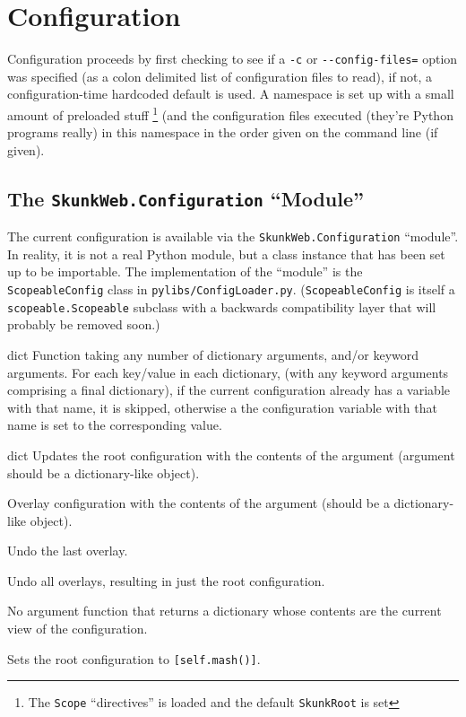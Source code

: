 \documentclass{manual}
\begin{document}
\section{Configuration}
Configuration proceeds by first checking to see if a \verb!-c! or
\verb!--config-files=! option was specified (as a colon delimited list
of configuration files to read), if not, a configuration-time
hardcoded default is used.  A namespace is set up with a small amount
of preloaded stuff \footnote{The \texttt{Scope} ``directives'' is loaded and the default \texttt{SkunkRoot} is set}
(and the configuration files executed (they're
Python programs really) in this namespace in the order given on the
command line (if given).

\subsection{The \texttt{SkunkWeb.Configuration} ``Module''}

The current configuration is available via the
\texttt{SkunkWeb.Configuration} ``module''.  In reality, it is not a
real Python module, but a class instance that has been set up to be
importable.  The implementation of the ``module'' is the
\texttt{ScopeableConfig} class in  \verb!pylibs/ConfigLoader.py!.
(\texttt{ScopeableConfig} is itself a \texttt{scopeable.Scopeable} subclass
with a backwards compatibility layer that will probably be removed soon.)

\begin{methoddesc}{\mergeDefaults}{dict} Function taking any number of dictionary
arguments, and/or keyword arguments. For each key/value in each dictionary, (with 
any keyword arguments comprising a final dictionary), if the current
configuration already has a variable with that name, it is skipped,
otherwise a the configuration variable with that name is set to the
corresponding value. 
\end{methoddesc}

\begin{methoddesc}{\update}{dict} Updates the root configuration with the
contents of the argument (argument should be a dictionary-like
object). 
\end{methoddesc}
\begin{methoddesc}{\push}{} Overlay configuration with the contents
of the argument (should be a dictionary-like object). 
\end{methoddesc}
\begin{methoddesc}{\pop}{} Undo the last overlay.
\end{methoddesc}
\begin{methoddesc}{\trim}{} Undo all overlays, resulting in just the
root configuration. 
\end{methoddesc}
\begin{methoddesc}{\mash}{} No argument function that returns a
dictionary whose contents are the current view of the configuration.
\end{methoddesc}
\begin{methoddesc}{\mashSelf}{} Sets the root configuration to
\verb![self.mash()]!. 
\end{methoddesc}
\end{document}
